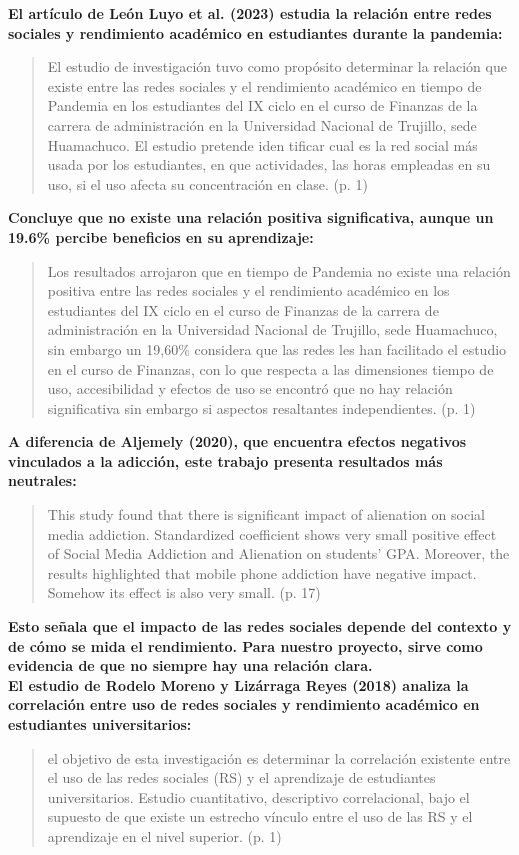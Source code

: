 \documentclass[12pt]{article}
\begin{document}
\textbf{El artículo de León Luyo et al. (2023) estudia la relación entre redes sociales y rendimiento académico en estudiantes durante la pandemia:}
\begin{quote}
    El estudio de investigación tuvo como propósito determinar la relación que existe entre las redes sociales y el rendimiento académico en tiempo de Pandemia en los estudiantes del IX ciclo en el curso de Finanzas de la carrera de administración en la Universidad Nacional de Trujillo, sede Huamachuco. El estudio pretende iden tificar cual es la red social más usada por los estudiantes, en que actividades, las horas empleadas en su uso, si el uso afecta su concentración en clase. (p. 1)
\end{quote}

\textbf{Concluye que no existe una relación positiva significativa, aunque un 19.6\% percibe beneficios en su aprendizaje:}
\begin{quote}
    Los resultados arrojaron que en tiempo de Pandemia no existe una relación positiva entre las redes sociales y el rendimiento académico en los estudiantes del IX ciclo en el curso de Finanzas de la carrera de administración en la Universidad Nacional de Trujillo, sede Huamachuco, sin embargo un 19,60\% considera que las redes les han facilitado el estudio en el curso de Finanzas, con lo que respecta a las dimensiones tiempo de uso, accesibilidad y efectos de uso se encontró que no hay relación significativa sin embargo si aspectos resaltantes independientes. (p. 1)
\end{quote}

\textbf{A diferencia de Aljemely (2020), que encuentra efectos negativos vinculados a la adicción, este trabajo presenta resultados más neutrales:}
\begin{quote}
    This study found that there is significant impact of alienation on social media addiction. Standardized  coefficient shows very small positive effect of Social Media Addiction and Alienation on students’ 
    GPA. Moreover, the results highlighted that mobile phone addiction have negative impact. Somehow 
    its effect is also very small. (p. 17) 
\end{quote}

\textbf{Esto señala que el impacto de las redes sociales depende del contexto y de cómo se mida el rendimiento. Para nuestro proyecto, sirve como evidencia de que no siempre hay una relación clara.}\\


\textbf{El estudio de Rodelo Moreno y Lizárraga Reyes (2018) analiza la correlación entre uso de redes sociales y rendimiento académico en estudiantes universitarios:}
\begin{quote}
    el objetivo de esta investigación es determinar la correlación existente 
    entre el uso de las redes sociales (RS) y el aprendizaje de estudiantes universitarios. Estudio cuantitativo, descriptivo
    correlacional, bajo el supuesto de que existe un estrecho vínculo entre el uso de las RS y el aprendizaje en el nivel superior. (p. 1)
\end{quote}
\end{document}
